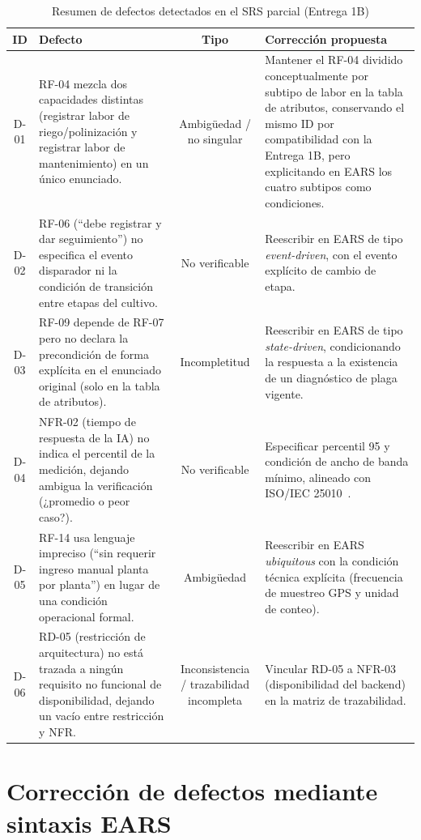 \documentclass[11pt,a4paper]{report}
\begin{document}
\begin{table}[H]
\centering
\small
\caption{Resumen de defectos detectados en el SRS parcial (Entrega 1B)}
\label{tab:defectos-resumen}
\begin{tabularx}{\linewidth}{|c|Y|c|Y|}
\hline
\textbf{ID} & \textbf{Defecto} & \textbf{Tipo} & \textbf{Corrección propuesta} \\
\hline
D-01 & RF-04 mezcla dos capacidades distintas (registrar labor de riego/polinización y registrar labor
de mantenimiento) en un único enunciado. & Ambigüedad / no singular & Mantener el RF-04 dividido
conceptualmente por subtipo de labor en la tabla de atributos, conservando el mismo ID por
compatibilidad con la Entrega 1B, pero explicitando en EARS los cuatro subtipos como condiciones. \\
\hline
D-02 & RF-06 (``debe registrar y dar seguimiento'') no especifica el evento disparador ni la condición
de transición entre etapas del cultivo. & No verificable & Reescribir en EARS de tipo
\textit{event-driven}, con el evento explícito de cambio de etapa. \\
\hline
D-03 & RF-09 depende de RF-07 pero no declara la precondición de forma explícita en el enunciado
original (solo en la tabla de atributos). & Incompletitud & Reescribir en EARS de tipo
\textit{state-driven}, condicionando la respuesta a la existencia de un diagnóstico de plaga vigente. \\
\hline
D-04 & NFR-02 (tiempo de respuesta de la IA) no indica el percentil de la medición, dejando ambigua la
verificación (¿promedio o peor caso?). & No verificable & Especificar percentil 95 y condición de
ancho de banda mínimo, alineado con ISO/IEC 25010~\cite{iso25010}. \\
\hline
D-05 & RF-14 usa lenguaje impreciso (``sin requerir ingreso manual planta por planta'') en lugar de una
condición operacional formal. & Ambigüedad & Reescribir en EARS \textit{ubiquitous} con la condición
técnica explícita (frecuencia de muestreo GPS y unidad de conteo). \\
\hline
D-06 & RD-05 (restricción de arquitectura) no está trazada a ningún requisito no funcional de
disponibilidad, dejando un vacío entre restricción y NFR. & Inconsistencia / trazabilidad incompleta &
Vincular RD-05 a NFR-03 (disponibilidad del backend) en la matriz de trazabilidad. \\
\hline
\end{tabularx}
\end{table}

\section{Corrección de defectos mediante sintaxis EARS}
\end{document}
